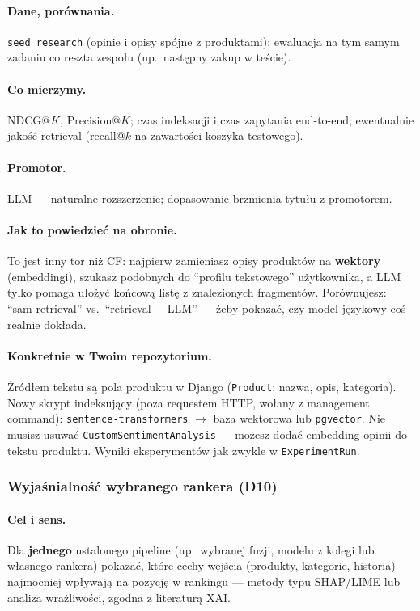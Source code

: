 \documentclass[a4paper,11pt]{article}
\newcommand{\code}[1]{\texttt{\small #1}}
\begin{document}
\paragraph{Dane, porównania.}
\texttt{seed\_research} (opinie i opisy spójne z produktami); ewaluacja na tym samym zadaniu co reszta zespołu (np.\ następny zakup w teście).

\paragraph{Co mierzymy.}
NDCG@$K$, Precision@$K$; czas indeksacji i czas zapytania end-to-end; ewentualnie jakość retrieval (recall@$k$ na zawartości koszyka testowego).

\paragraph{Promotor.}
LLM --- naturalne rozszerzenie; dopasowanie brzmienia tytułu z promotorem.

\paragraph{Jak to powiedzieć na obronie.}
To jest inny tor niż CF: najpierw zamieniasz opisy produktów na \textbf{wektory} (embeddingi), szukasz podobnych do ``profilu tekstowego'' użytkownika, a LLM tylko pomaga ułożyć końcową listę z znalezionych fragmentów. Porównujesz: ``sam retrieval'' vs.\ ``retrieval + LLM'' --- żeby pokazać, czy model językowy coś realnie dokłada.

\paragraph{Konkretnie w Twoim repozytorium.}
Źródłem tekstu są pola produktu w Django (\code{Product}: nazwa, opis, kategoria). Nowy skrypt indeksujący (poza requestem HTTP, wołany z management command): \code{sentence-transformers} $\to$ baza wektorowa lub \code{pgvector}. Nie musisz usuwać \code{CustomSentimentAnalysis} --- możesz dodać embedding opinii do tekstu produktu. Wyniki eksperymentów jak zwykle w \code{ExperimentRun}.

\subsubsection{Wyjaśnialność wybranego rankera (\textbf{D10})}

\paragraph{Cel i sens.}
Dla \textbf{jednego} ustalonego pipeline (np.\ wybranej fuzji, modelu z kolegi lub własnego rankera) pokazać, które cechy wejścia (produkty, kategorie, historia) najmocniej wpływają na pozycję w rankingu --- metody typu SHAP/LIME lub analiza wrażliwości, zgodna z literaturą XAI.
\end{document}

